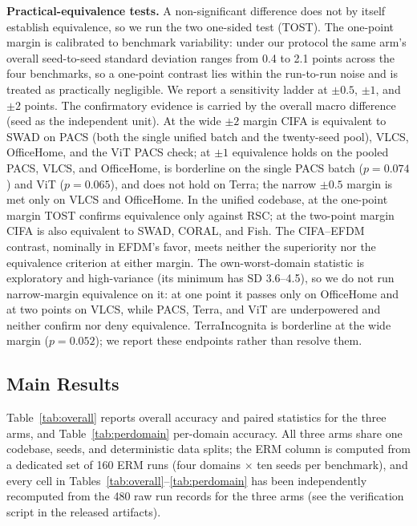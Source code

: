 \documentclass[electronics,article,submit,moreauthors]{Definitions/mdpi}
\newcommand{\add}[1]{\textcolor{addblue}{#1}}
\newcommand{\del}[1]{\textcolor{delred}{\st{#1}}}
\def\add#1{#1}
\def\del#1{}
\begin{document}
\textbf{Practical-equivalence tests.} A non-significant difference does not by itself establish equivalence, so we run the two one-sided test (TOST). The one-point margin is calibrated to benchmark variability: under our protocol the same arm's overall seed-to-seed standard deviation ranges from 0.4 to 2.1 points across the four benchmarks, so a one-point contrast lies within the run-to-run noise and is treated as practically negligible. We report a sensitivity ladder at $\pm0.5$, $\pm1$, and $\pm2$ points. The confirmatory evidence is carried by the overall macro difference (seed as the independent unit). At the wide $\pm2$ margin CIFA is equivalent to SWAD on PACS (both the single unified batch and the twenty-seed pool), VLCS, OfficeHome, and the ViT PACS check; at $\pm1$ equivalence holds on the pooled PACS, VLCS, and OfficeHome, is borderline on the single PACS batch ($p=0.074$) and ViT ($p=0.065$), and does not hold on Terra; the narrow $\pm0.5$ margin is met only on VLCS and OfficeHome. \del{In the unified codebase CIFA is equivalent to CORAL, RSC, and Fish at one point, while the CIFA--EFDM contrast, nominally in EFDM's favor, meets neither the superiority nor the strictest-adjusted equivalence criterion.}
\add{In the unified codebase, at the one-point margin TOST confirms equivalence only against RSC; at the two-point margin CIFA is also equivalent to SWAD, CORAL, and Fish. The CIFA--EFDM contrast, nominally in EFDM's favor, meets neither the superiority nor the equivalence criterion at either margin.} The own-worst-domain statistic is exploratory and high-variance (its minimum has SD 3.6--4.5), so we do not run narrow-margin equivalence on it: at one point it passes only on OfficeHome and at two points on VLCS, while PACS, Terra, and ViT are underpowered and neither confirm nor deny equivalence. TerraIncognita is borderline at the wide margin ($p=0.052$); we report these endpoints rather than resolve them.

\subsection{Main Results}

Table~\ref{tab:overall} reports overall accuracy and paired statistics for the three arms, and Table~\ref{tab:perdomain} per-domain accuracy. All three arms share one codebase, seeds, and deterministic data splits; the ERM column is computed from a dedicated set of 160 ERM runs (four domains $\times$ ten seeds per benchmark), and every cell in Tables~\ref{tab:overall}--\ref{tab:perdomain} has been independently recomputed from the 480 raw run records for the three arms (see the verification script in the released artifacts).
\end{document}
